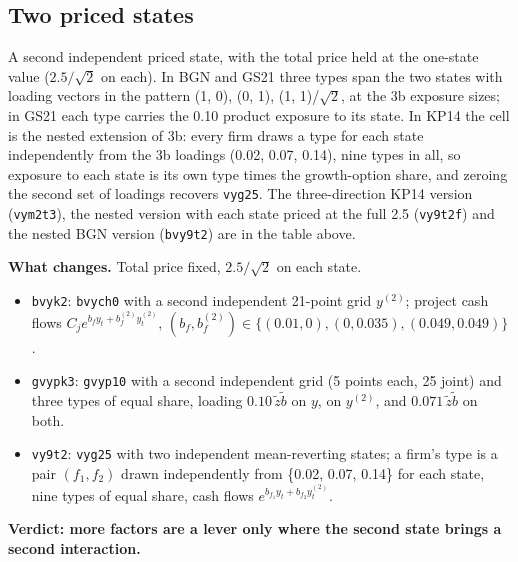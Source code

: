 \documentclass[11pt]{article}
\begin{document}
\subsection*{Two priced states}

A second independent priced state, with the total price held at the one-state value ($2.5/\sqrt{2}$ on each). In BGN and GS21 three types span the two states with loading vectors in the pattern (1, 0), (0, 1), (1, 1)/$\sqrt{2}$, at the 3b exposure sizes; in GS21 each type carries the 0.10 product exposure to its state. In KP14 the cell is the nested extension of 3b: every firm draws a type for each state independently from the 3b loadings (0.02, 0.07, 0.14), nine types in all, so exposure to each state is its own type times the growth-option share, and zeroing the second set of loadings recovers \texttt{vyg25}. The three-direction KP14 version (\texttt{vym2t3}), the nested version with each state priced at the full 2.5 (\texttt{vy9t2f}) and the nested BGN version (\texttt{bvy9t2}) are in the table above.



\textbf{What changes.} Total price fixed, $2.5/\sqrt{2}$ on each state.

\begin{itemize}
\item \texttt{bvyk2}: \texttt{bvych0} with a second independent 21-point grid $y^{(2)}$; project cash flows $C_j e^{b_f y_t + b_f^{(2)} y^{(2)}_t}$, $(b_f, b_f^{(2)}) \in \{(0.01, 0), (0, 0.035), (0.049, 0.049)\}$.
\item \texttt{gvypk3}: \texttt{gvyp10} with a second independent grid (5 points each, 25 joint) and three types of equal share, loading $0.10\,\tilde z \tilde b$ on $y$, on $y^{(2)}$, and $0.071\,\tilde z \tilde b$ on both.
\item \texttt{vy9t2}: \texttt{vyg25} with two independent mean-reverting states; a firm's type is a pair $(f_1, f_2)$ drawn independently from \{0.02, 0.07, 0.14\} for each state, nine types of equal share, cash flows $e^{b_{f_1} y_t + b_{f_2} y^{(2)}_t}$.
\end{itemize}
\textbf{Verdict: more factors are a lever only where the second state brings a second interaction.}
\end{document}
